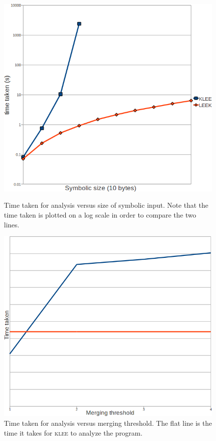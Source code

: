 \documentclass[12pt,a4paper]{article}
\newcommand{\klee}{\textsc{klee }}
\begin{document}
\begin{figure}
  \hfill
  \begin{minipage}[t]{.45\textwidth}
    \begin{center}  
      \includegraphics[width=\textwidth]{bpf_graph.png}
      \caption{Time taken for analysis versus size of symbolic input. Note that the time taken is plotted on a log scale in order to compare the two lines.}
      \label{bpfgraph}
    \end{center}
  \end{minipage}
  \hfill
  \begin{minipage}[t]{.45\textwidth}
    \begin{center}  
      \includegraphics[width=\textwidth]{threshold_graph.png}
      \caption{Time taken for analysis versus merging threshold. The flat line is the time it takes for \klee to analyze the program.}
      \label{threshgraph}
    \end{center}
  \end{minipage}
  \hfill
\end{figure}
\end{document}
